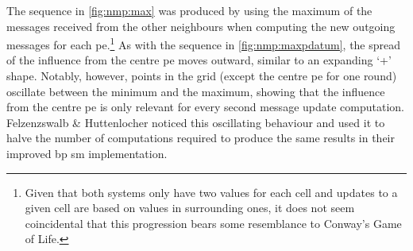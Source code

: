 The sequence in \cref{fig:nmp:max} was produced by using the maximum of the messages received from the other neighbours when computing the new outgoing messages for each \gls{pe}.\footnote{Given that both systems only have two values for each cell and updates to a given cell are based on values in surrounding ones, it does not seem coincidental that this progression bears some resemblance to Conway's Game of Life.}  As with the sequence in \cref{fig:nmp:maxpdatum}, the spread of the influence from the centre \gls{pe} moves outward, similar to an expanding `+' shape.  Notably, however, points in the grid (except the centre \gls{pe} for one round) oscillate between the minimum and the maximum, showing that the influence from the centre \gls{pe} is only relevant for every second message update computation.  Felzenzswalb \& Huttenlocher \cite{Felzenszwalb2006} noticed this oscillating behaviour and used it to halve the number of computations required to produce the same results in their improved \gls{bp} \gls{sm} implementation.


